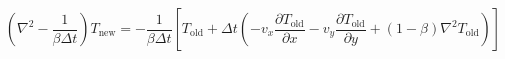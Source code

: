 \documentclass[preview]{standalone}
\begin{document}
\setcounter{equation}{11}
\begin{dmath*}
    \left ( \nabla^2 - \frac{1}{\beta \Delta t} \right ) T_{\text{new}} = - \frac{1}{\beta \Delta t} \left [ T_{\text{old}} + \Delta t \left ( -v_x \frac{\partial T_{\text{old}}}{\partial x} -v_y \frac{\partial T_{\text{old}}}{\partial y} + (1 - \beta) \nabla^2 T_{\text{old}} \right ) \right ]
\end{dmath*}
\end{document}
